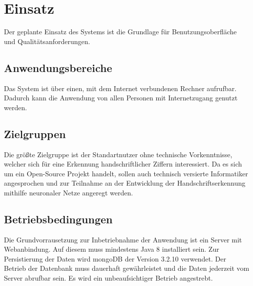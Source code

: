 \section{Einsatz}
Der geplante Einsatz des Systems ist die Grundlage für Benutzungsoberfläche und
Qualitätsanforderungen.
 
\subsection{Anwendungsbereiche}

Das System ist über einen, mit dem Internet verbundenen Rechner aufrufbar.
Dadurch kann die Anwendung von allen Personen mit Internetzugang genutzt werden.


 
\subsection{Zielgruppen}

Die größte Zielgruppe ist der Standartnutzer ohne technische Vorkenntnisse, welcher sich für eine Erkennung handschriftlicher Ziffern interessiert.
Da es sich um ein Open-Source Projekt handelt, sollen auch technisch versierte Informatiker angesprochen und zur Teilnahme an der Entwicklung 
der Handschriftserkennung mithilfe neuronaler Netze angeregt werden.

\subsection{Betriebsbedingungen}

Die Grundvorrausetzung zur Inbetriebnahme der Anwendung ist ein Server mit Webanbindung. Auf diesem muss mindestens Java 8 installiert sein.
Zur Persistierung der Daten wird mongoDB der Version 3.2.10 verwendet. Der Betrieb der Datenbank muss dauerhaft gewährleistet und die Daten
jederzeit vom Server abrufbar sein. Es wird ein unbeaufsichtiger Betrieb angestrebt. 
